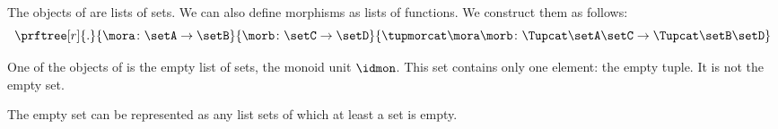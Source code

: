 The objects of \SetStar are lists of sets.
We can also define morphisms as lists of functions.
We construct them as follows:
%
\begin{equation}
    \label{eq:sets-monoid-maps2}
    \prftree[r]{.}{ 
        \mora \colon \setA \to \setB
    }{ 
        \morb \colon \setC \to \setD
    }{ 
        \tupmorcat \mora \morb \colon \Tupcat \setA   \setC \to \Tupcat \setB  \setD
    }
\end{equation}
%

One of the objects of \SetStar is the empty list of sets, the monoid unit $\idmon$.
This set contains only one element: the empty tuple.
It is not the empty set.

The empty set can be represented as any list sets of which at least a set is empty.


%

\showslides{
    \begin{forslides}
        
        \begin{equation}
            \tupca \ela   = \ela
        \end{equation}
        ~
        \begin{equation}
            \label{eq:sets-monoid-el-cat}
            \tupcat \ela \elb \elconcat \elc = \tupcatt \ela \elb \elc
        \end{equation}
    \end{forslides}
}
%
%
